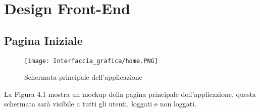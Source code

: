 \chapter{Design Front-End}


\section{Pagina Iniziale}

    \label{fig:4.1}
    \begin{figure}[H]
        \center
        \texttt{[image: Interfaccia\_grafica/home.PNG]}
        \caption{Schermata principale dell'applicazione}
    \end{figure}

    La Figura 4.1 mostra un mockup della pagina principale dell'applicazione, questa schermata sarà visibile a tutti gli utenti, loggati e non loggati.

